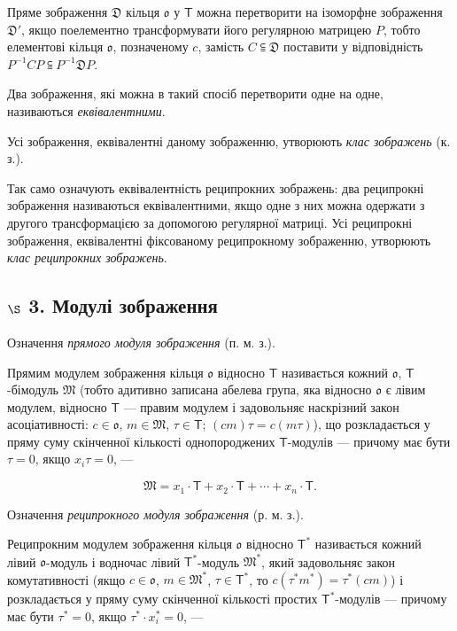 \documentclass[11pt]{article}
\begin{document}
Пряме зображення \(\mathfrak D\) кільця \(\mathfrak{o}\) у \(\mathsf T\) можна перетворити на ізоморфне зображення \(\mathfrak D'\), якщо поелементно трансформувати його регулярною матрицею \(P\), тобто елементові кільця \(\mathfrak{o}\), позначеному \(c\), замість \(C\subseteqq\mathfrak D\) поставити у відповідність \(P^{-1}CP\subseteqq P^{-1}\mathfrak D P\).

Два зображення, які можна в такий спосіб перетворити одне на одне, називаються \emph{еквівалентними}.

Усі зображення, еквівалентні даному зображенню, утворюють \emph{клас зображень} (к. з.).

Так само означують еквівалентність реципрокних зображень: два реципрокні зображення називаються еквівалентними, якщо одне з них можна одержати з другого трансформацією за допомогою регулярної матриці. Усі реципрокні зображення, еквівалентні фіксованому реципрокному зображенню, утворюють \emph{клас реципрокних зображень}.

\subsection*{\texorpdfstring{\(\S\) 3. Модулі зображення}{\textbackslash S 3. Модулі зображення}}\label{s-3.-darstellungsmoduln}

Означення \emph{прямого модуля зображення} (п. м. з.).

Прямим модулем зображення кільця \(\mathfrak{o}\) відносно \(\mathsf T\) називається кожний \(\mathfrak{o}\), \(\mathsf T\)-бімодуль \(\mathfrak M\) (тобто адитивно записана абелева група, яка відносно \(\mathfrak{o}\) є лівим модулем, відносно \(\mathsf T\) --- правим модулем і задовольняє наскрізний закон асоціативності: \(c\in\mathfrak{o}\), \(m\in\mathfrak M\), \(\tau\in\mathsf T\); \((cm)\tau=c(m\tau)\)), що розкладається у пряму суму скінченної кількості однопороджених \(\mathsf T\)-модулів --- причому має бути \(\tau=0\), якщо \(x_i\tau=0\), ---

\[
\mathfrak M=x_1\cdot\mathsf T+x_2\cdot\mathsf T+\cdots+x_n\cdot\mathsf T.
\]

Означення \emph{реципрокного модуля зображення} (р. м. з.).

Реципрокним модулем зображення кільця \(\mathfrak{o}\) відносно \(\mathsf T^*\) називається кожний лівий \(\mathfrak{o}\)-модуль і водночас лівий \(\mathsf T^*\)-модуль \(\mathfrak M^*\), який задовольняє закон комутативності (якщо \(c\in\mathfrak{o}\), \(m\in\mathfrak M^*\), \(\tau\in\mathsf T^*\), то \(c(\tau^*m^*)=\tau^*(cm)\)) і розкладається у пряму суму скінченної кількості простих \(\mathsf T^*\)-модулів --- причому має бути \(\tau^*=0\), якщо \(\tau^*\cdot x_i^*=0\), ---
\end{document}
